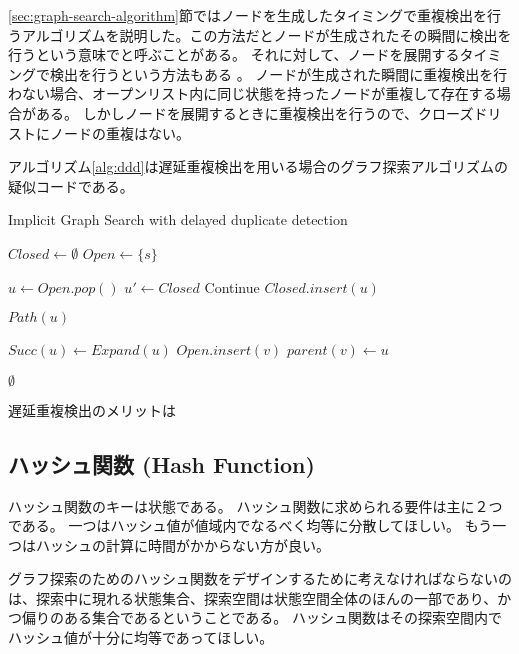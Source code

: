 \ref{sec:graph-search-algorithm}節ではノードを生成したタイミングで重複検出を行うアルゴリズムを説明した。この方法だとノードが生成されたその瞬間に検出を行うという意味でと呼ぶことがある。
それに対して、ノードを展開するタイミングで検出を行うという方法もある \cite{korf2003delayed}。
ノードが生成された瞬間に重複検出を行わない場合、オープンリスト内に同じ状態を持ったノードが重複して存在する場合がある。
しかしノードを展開するときに重複検出を行うので、クローズドリストにノードの重複はない。

アルゴリズム\ref{alg:ddd}は遅延重複検出を用いる場合のグラフ探索アルゴリズムの疑似コードである。

\begin{algorithm}
\caption{Implicit Graph Search with delayed duplicate detection}
\label{alg:ddd}
	$Closed \leftarrow \emptyset$\;
	$Open \leftarrow \{s\}$\;
	 {
		$u \leftarrow Open.pop()$\;
		 {
			$u' \leftarrow Closed$
			Continue\;
		}
		$Closed.insert(u)$\;
		
		 {
			\Return $Path(u)$\;
		}
		
		$Succ(u) \leftarrow Expand(u)$\;
		 {
			$Open.insert(v)$\;
			$parent(v) \leftarrow u$\;
		}
 	}
	\Return $\emptyset$\;
\end{algorithm}


遅延重複検出のメリットは


\subsection{ハッシュ関数 (Hash Function)}
\label{sec:hash-function}

ハッシュ関数のキーは状態である。
ハッシュ関数に求められる要件は主に２つである。
一つはハッシュ値が値域内でなるべく均等に分散してほしい。
もう一つはハッシュの計算に時間がかからない方が良い。

グラフ探索のためのハッシュ関数をデザインするために考えなければならないのは、探索中に現れる状態集合、探索空間は状態空間全体のほんの一部であり、かつ偏りのある集合であるということである。
ハッシュ関数はその探索空間内でハッシュ値が十分に均等であってほしい。


